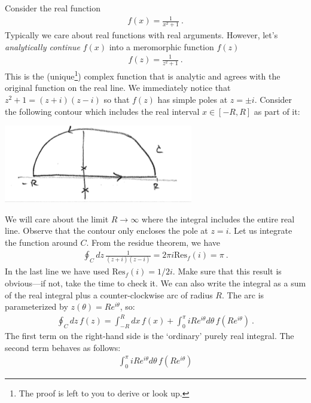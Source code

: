 \begin{example}
Consider the real function
\begin{align}
  f(x) = \frac{1}{x^2 +1} \ .
\end{align}
Typically we care about real functions with real arguments. However, let's \emph{analytically continue} $f(x)$ into a meromorphic function $f(z)$
\begin{align}
  f(z) = \frac{1}{z^2+1} \ .
\end{align}
This is the (unique\footnote{The proof is left to you to derive or look up.}) complex function that is analytic and agrees with the original function on the real line. We immediately notice that $z^2+1 = (z+i)(z-i)$ so that $f(z)$ has simple poles at $z=\pm i$. Consider the following contour which includes the real interval $x\in [-R,R]$ as part of it:
\begin{center}
\includegraphics[width=.7\textwidth]{figures/Lec_2017_14_contour.png}
\end{center}
We will care about the limit $R\to \infty$ where the integral includes the entire real line.
Observe that the contour only encloses the pole at $z=i$. Let us integrate the function around $C$. From the residue theorem, we have
\begin{align}
  \oint_Cdz\, \frac{1}{(z+i)(z-i)} 
  = 2\pi i \text{Res}_f(i) 
  = \pi \ .
\end{align}
In the last line we have used $\text{Res}_f(i)=1/2i$. Make sure that this result is obvious---if not, take the time to check it. We can also write the integral as a sum of the real integral plus a counter-clockwise arc of radius $R$. The arc is parameterized by $z(\theta) = Re^{i\theta}$, so:
\begin{align}
  \oint_C dz\, f(z) = \int_{-R}^R dx\, f(x) 
  + \int_0^\pi iR e^{i\theta} d\theta  \, f\left(Re^{i\theta}\right) \ .
\end{align}
The first term on the right-hand side is the `ordinary' purely real integral. The second term behaves as follows:
\begin{align}
  \int_0^\pi iR e^{i\theta} d\theta  \, f\left(Re^{i\theta}\right)

\end{align}
\end{example}
